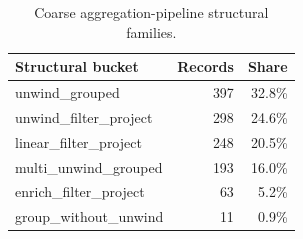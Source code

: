 \begin{table}[t]
\centering
\caption{Coarse aggregation-pipeline structural families.}
\label{tab:tend-stage-structural-buckets}
\begin{tabular}{lrr}
\toprule
Structural bucket & Records & Share \\
\midrule
unwind\_grouped & 397 & 32.8\% \\
unwind\_filter\_project & 298 & 24.6\% \\
linear\_filter\_project & 248 & 20.5\% \\
multi\_unwind\_grouped & 193 & 16.0\% \\
enrich\_filter\_project & 63 & 5.2\% \\
group\_without\_unwind & 11 & 0.9\% \\
\bottomrule
\end{tabular}
\end{table}
